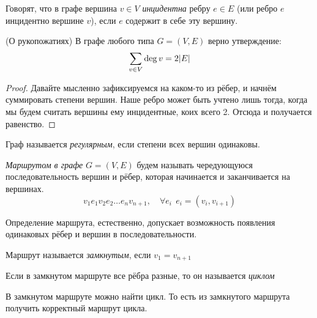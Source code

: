 \begin{definition}
	Говорят, что в графе вершина $v \in V$ \textit{инцидентна} ребру $e \in E$ (или ребро $e$ инцидентно вершине $v$), если $e$ содержит в себе эту вершину.
\end{definition}

\begin{lemma} (О рукопожатиях)
	В графе любого типа $G = (V, E)$ верно утверждение:
	\[
		\sum\limits_{v \in V} \deg v = 2|E|
	\]
\end{lemma}

\begin{proof}
	Давайте мысленно зафиксируемся на каком-то из рёбер, и начнём суммировать степени вершин. Наше ребро может быть учтено лишь тогда, когда мы будем считать вершины ему инцидентные, коих всего 2. Отсюда и получается равенство.
\end{proof}

\begin{definition}
	Граф называется \textit{регулярным}, если степени всех вершин одинаковы.
\end{definition}

\begin{definition}
	\textit{Маршрутом в графе} $G = (V, E)$ будем называть чередующуюся последовательность вершин и рёбер, которая начинается и заканчивается на вершинах.
	\[
		v_1 e_1 v_2 e_2 \ldots e_n v_{n + 1}, \quad \forall e_i\ \ e_i = (v_i, v_{i + 1})
	\]
\end{definition}

\begin{note}
	Определение маршрута, естественно, допускает возможность появления одинаковых рёбер и вершин в последовательности.
\end{note}

\begin{definition}
	Маршрут называется \textit{замкнутым}, если $v_1 = v_{n + 1}$
\end{definition}

\begin{definition}
	Если в замкнутом маршруте все рёбра разные, то он называется \textit{циклом}
\end{definition}

\begin{lemma}
	В замкнутом маршруте можно найти цикл. То есть из замкнутого маршрута получить корректный маршрут цикла.
\end{lemma}

